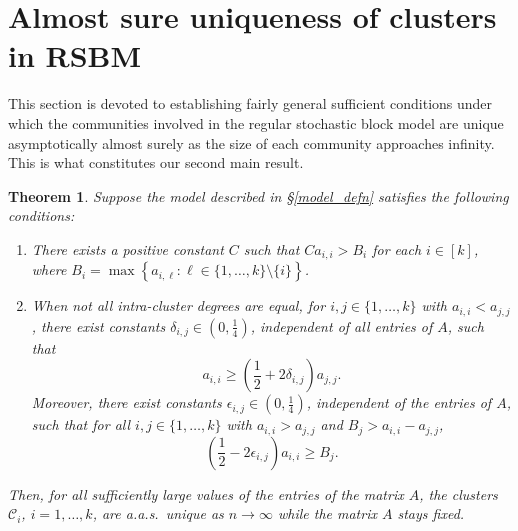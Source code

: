 \documentclass[11pt,reqno]{amsart}
\newtheorem{theorem}{Theorem}[section]
\theoremstyle{definition}
\theoremstyle{remark}
\theoremstyle{conjecture}
\begin{document}

\section{Almost sure uniqueness of clusters in RSBM}\label{sec:unique}
This section is devoted to establishing fairly general sufficient conditions under which the communities involved in the regular stochastic block model are unique asymptotically almost surely as the size of each community approaches infinity. This is what constitutes our second main result. 
\begin{theorem}\label{main_2}
Suppose the model described in \S\ref{model_defn} satisfies the following conditions:
\begin{enumerate}
\item \label{intra_degrees_same} There exists a positive constant $C$ such that $C a_{i,i} > B_{i}$ for each $i \in [k]$, where $B_{i} = \max\left\{a_{i,\ell}: \ell \in \{1, \ldots, k\} \setminus \{i\}\right\}$.
\item When not all intra-cluster degrees are equal, for $i, j \in \{1, \ldots, k\}$ with $a_{i,i} < a_{j,j}$, there exist constants $\delta_{i,j} \in \left(0, \frac{1}{4}\right)$, independent of all entries of $A$, such that  
\begin{equation}\label{not_all_intra_degrees_same_cond'}
a_{i,i} \geqslant \left(\frac{1}{2} + 2\delta_{i,j}\right)a_{j,j}.
\end{equation}
Moreover, there exist constants $\epsilon_{i,j} \in \left(0, \frac{1}{4}\right)$, independent of the entries of $A$, such that for all $i, j \in \{1, \ldots, k\}$ with $a_{i,i} > a_{j,j}$ and $B_{j} > a_{i,i} - a_{j,j}$,
\begin{equation}\label{not_all_intra_degrees_same_cond}
\left(\frac{1}{2} - 2\epsilon_{i,j}\right)a_{i,i} \geqslant B_{j}.
\end{equation}  
\end{enumerate}
Then, for all sufficiently large values of the entries of the matrix $A$, the clusters $\mathcal{C}_{i}$, $i = 1, \ldots, k$, are a.a.s.\ unique as $n \rightarrow \infty$ while the matrix $A$ stays fixed. 
\end{theorem}
\end{document}
